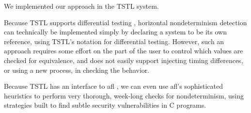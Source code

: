 We implemented our approach in the TSTL \cite{NFM15} system.

Because TSTL supports differential testing \cite{tstlsttt}, horizontal
nondeterminism detection can technically be implemented simply by
declaring a system to be its own reference, using TSTL's notation for
differential testing.  However, such an approach requires some effort
on the part of the user to control which values are checked for
equivalence, and does not easily support injecting timing differences,
or using a new process, in checking the behavior.



Because TSTL has an interface to afl \cite{aflfuzz}, we can even use
afl's sophisticated heuristics to perform very thorough, week-long
checks for nondeterminism, using strategies built to find subtle
security vulnerabilities in C programs.